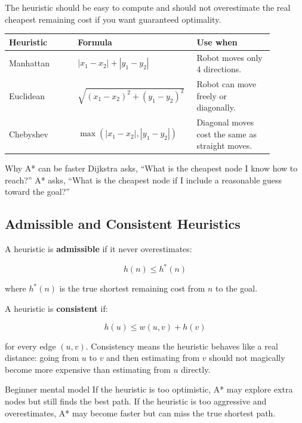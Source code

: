 \documentclass[11pt,a4paper]{article}
\begin{document}
The heuristic should be easy to compute and should not overestimate the real cheapest remaining cost if you want guaranteed optimality.

\begin{center}
\begin{tabular}{>{\raggedright\arraybackslash}p{0.25\linewidth} >{\raggedright\arraybackslash}p{0.35\linewidth} >{\raggedright\arraybackslash}p{0.28\linewidth}}
\toprule
\textbf{Heuristic} & \textbf{Formula} & \textbf{Use when}\\
\midrule
Manhattan & $|x_1-x_2|+|y_1-y_2|$ & Robot moves only 4 directions.\\
Euclidean & $\sqrt{(x_1-x_2)^2+(y_1-y_2)^2}$ & Robot can move freely or diagonally.\\
Chebyshev & $\max(|x_1-x_2|,|y_1-y_2|)$ & Diagonal moves cost the same as straight moves.\\
\bottomrule
\end{tabular}
\end{center}

\begin{bigidea}{Why A* can be faster}
Dijkstra asks, ``What is the cheapest node I know how to reach?'' A* asks, ``What is the cheapest node if I include a reasonable guess toward the goal?''
\end{bigidea}

\subsection{Admissible and Consistent Heuristics}

A heuristic is \textbf{admissible} if it never overestimates:

\[
h(n) \le h^*(n)
\]

where $h^*(n)$ is the true shortest remaining cost from $n$ to the goal.

A heuristic is \textbf{consistent} if:

\[
h(u) \le w(u,v) + h(v)
\]

for every edge $(u,v)$. Consistency means the heuristic behaves like a real distance: going from $u$ to $v$ and then estimating from $v$ should not magically become more expensive than estimating from $u$ directly.

\begin{gentle}{Beginner mental model}
If the heuristic is too optimistic, A* may explore extra nodes but still finds the best path. If the heuristic is too aggressive and overestimates, A* may become faster but can miss the true shortest path.
\end{gentle}
\end{document}
